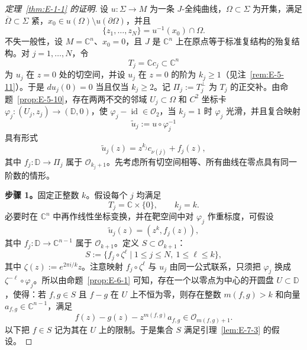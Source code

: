 \begin{proof}[定理~\ref{thm:E-1-1} 的证明]
设 $u:\Sigma\to M$ 为一条 $J$-全纯曲线，$\Omega\subset\Sigma$ 为开集，满足 $\overline\Omega\subset\Sigma$ 紧，$x_0\in u(\Omega)\setminus u(\partial\Omega)$，并且
\[
  \{z_1,\ldots,z_N\}=u^{-1}(x_0)\cap\Omega.
\]
不失一般性，设 $M=\mathbb C^n$、$x_0=0$，且 $J$ 是 $\mathbb C^n$ 上在原点等于标准复结构的殆复结构。对 $j=1,\ldots,N$，令
\[
  T_j=\mathbb Cc_j\subset\mathbb C^n
\]
为 $u_j$ 在 $z=0$ 处的切空间，并设 $u_j$ 在 $z=0$ 的阶为 $k_j\ge1$（见注~\ref{rem:E-5-11}）。于是 $du_j(0)=0$ 当且仅当 $k_j\ge2$。记 $\Pi_j:=T_j^\perp$ 为 $T_j$ 的正交补。由命题~\ref{prop:E-5-10}，存在两两不交的邻域 $U_j\subset\Omega$ 和 $C^2$ 坐标卡 $\varphi_j:(U_j,z_j)\to(\mathbb D,0)$，使 $\varphi_j-\operatorname{id}\in\mathcal O_2$，当 $k_j=1$ 时 $\varphi_j$ 光滑，并且复合映射
\[
  \widetilde u_j:=u\circ\varphi_j^{-1}
\]
具有形式
\[
  \widetilde u_j(z)=z^{k_j}c_{\nu(j)}+f_j(z),
\]
其中 $f_j:\mathbb D\to\Pi_j$ 属于 $\mathcal O_{k_j+1}$。先考虑所有切空间相等、所有曲线在零点具有同一阶数的情形。

\noindent\textbf{步骤 1。}固定正整数 $k$。假设每个 $j$ 均满足
\[
  T_j=\mathbb C\times\{0\},\qquad k_j=k.
\]
必要时在 $\mathbb C^n$ 中再作线性坐标变换，并在靶空间中对 $\varphi_j$ 作重标度，可假设
\[
  \widetilde u_j(z)=(z^k,f_j(z)),
\]
其中 $f_j:\mathbb D\to\mathbb C^{n-1}$ 属于 $\mathcal O_{k+1}$。定义 $S\subset\mathcal O_{k+1}$：
\[
  S:=\{f_j\circ\zeta^\ell\mid1\le j\le N,\ 1\le\ell\le k\},
\]
其中 $\zeta(z):=e^{2\pi i/k}z$。注意映射 $f_j\circ\zeta^\ell$ 与 $u_j$ 由同一公式联系，只须把 $\varphi_j$ 换成 $\zeta^{-\ell}\circ\varphi_j$。所以由命题~\ref{prop:E-6-1} 可知，存在一个以零点为中心的开圆盘 $U\subset\mathbb D$，使得：若 $f,g\in S$ 且 $f-g$ 在 $U$ 上不恒为零，则存在整数 $m(f,g)>k$ 和向量 $a_{f,g}\in\mathbb C^{n-1}$，满足
\[
  f(z)-g(z)-z^{m(f,g)}a_{f,g}\in\mathcal O_{m(f,g)+1}.
\]
以下把 $f\in S$ 记为其在 $U$ 上的限制。于是集合 $S$ 满足引理~\ref{lem:E-7-3} 的假设。


\end{proof}
